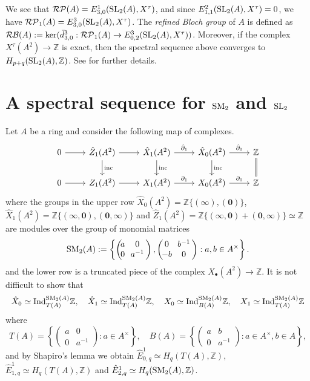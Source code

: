 \documentclass[11pt]{amsart}
\theoremstyle{definition}
\theoremstyle{plain}
\numberwithin{equation}{section}
\newcommand{\z}{\mathbb{Z}}
\newcommand{\RP}{\mathcal{RP}}
\newcommand{\RB}{\mathcal{RB}}
\renewcommand{\aa}{{A^\times}}
\newcommand{\Ind}{{\rm Ind}}
\newcommand{\SL}{\mathit{{\rm SL}}}
\newcommand{\SM}{\mathit{{\rm SM}}}
\newcommand{\inc}{{\rm inc}}
\newcommand{\mtxx}[4]
{\left(\!\!
\begin{array}{cc}
\!\!#1 & \!\!#2\\
\!\!#3 & \!\!#4
\end{array}\!\!
\right)}
\begin{document}
We see that $\RP(A)=E^1_{3,0}(\SL_2(A),X^{\tau})$, and since $E^2_{1,1}(\SL_2(A),X^\tau)=0$, we have $\RP_1(A)=E^3_{3,0}(\SL_2(A),X^{\tau})$. The \textit{refined Bloch group} of $A$ is defined as $\RB(A):=\ker(\bar{d}^3_{3,0}:\RP_1(A)\to E^3_{0,2}(\SL_2(A),X^{\tau}))$. Moreover, if the complex $X^{\tau}(A^2)\to\z$ is exact, then the spectral sequence above converges to $H_{p+q}(\SL_2(A),\z)$. See \cite[\S 3]{C-H2022} for further details.
\section{A spectral sequence for \texorpdfstring{$\SM_2$}{SM2} and \texorpdfstring{$\SL_2$}{SL2}}\label{sec-sseq-sm2-sl2}
Let $A$ be a ring and consider the following map of complexes.
\begin{equation}
    \label{sm-sl-cplx}
    \begin{tikzcd}
        0\ar[r] & \hat{Z}_1(A^2)\ar[r]\ar[d,"\inc"] & \hat{X}_1(A^2)\ar[r,"\hat{\partial}_1"]\ar[d,"\inc"] & \hat{X}_0(A^2)\ar[r,"\hat{\partial}_0"]\ar[d,"\inc"] & \z\ar[d,equal]\\
        0\ar[r] & Z_1(A^2)\ar[r] & X_1(A^2)\ar[r,"\partial_1"] & X_0(A^2)\ar[r,"\partial_0"] & \z
    \end{tikzcd}
\end{equation}
where the groups in the upper row $\hat{X}_0(A^2)=\z\{(\pmb{\infty}),(\pmb{0})\}$, $\hat{X}_1(A^2)=\z\{(\pmb{\infty},\pmb{0}),(\pmb{0},\pmb{\infty})\}$ and $\hat{Z}_1(A^2)=\z\{(\pmb{\infty},\pmb{0})+(\pmb{0},\pmb{\infty})\}\simeq\z$ are modules over the group of monomial matrices
\[
\SM_2(A):=\left\{\mtxx{a}{0}{0}{a^{-1}},\mtxx{0}{b^{-1}}{-b}{0}: a,b\in\aa\right\}.
\]
and the lower row is a truncated piece of the complex $X_{\bullet}(A^2)\to\z$. It is not difficult to show that
\begin{equation}
    \label{struct-X-hatX}
    \hat{X}_0\simeq\Ind^{\SM_2(A)}_{T(A)}\z,\quad \hat{X}_1\simeq\Ind^{\SM_2(A)}_{T(A)}\z,\quad  X_0\simeq\Ind^{\SM_2(A)}_{B(A)}\z,\quad X_1\simeq\Ind^{\SM_2(A)}_{T(A)}\z    
\end{equation}
where
\[
    T(A)=\left\{\mtxx{a}{0}{0}{a^{-1}}: a\in\aa\right\},\quad B(A)=\left\{\mtxx{a}{b}{0}{a^{-1}}: a\in\aa, b\in A\right\},
\]
and by Shapiro's lemma we obtain $\hat{E}^1_{0,q}\simeq H_q(T(A),\z)$, $\hat{E}^1_{1,q}\simeq H_q(T(A),\z)$ and $\hat{E}^1_{2,q}\simeq H_q(\SM_2(A),\z)$.
\end{document}
